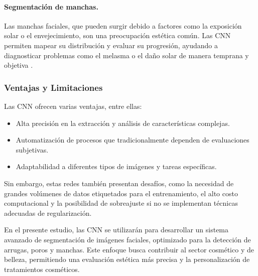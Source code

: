 \paragraph{Segmentación de manchas.}  
Las manchas faciales, que pueden surgir debido a factores como la exposición solar o el envejecimiento, son una preocupación estética común. Las CNN permiten mapear su distribución y evaluar su progresión, ayudando a diagnosticar problemas como el melasma o el daño solar de manera temprana y objetiva \parencite{autor2020segmentacion}.

\subsubsection{Ventajas y Limitaciones}  
Las CNN ofrecen varias ventajas, entre ellas:
\begin{itemize}
    \item Alta precisión en la extracción y análisis de características complejas.
    \item Automatización de procesos que tradicionalmente dependen de evaluaciones subjetivas.
    \item Adaptabilidad a diferentes tipos de imágenes y tareas específicas.
\end{itemize}

Sin embargo, estas redes también presentan desafíos, como la necesidad de grandes volúmenes de datos etiquetados para el entrenamiento, el alto costo computacional y la posibilidad de sobreajuste si no se implementan técnicas adecuadas de regularización.

En el presente estudio, las CNN se utilizarán para desarrollar un sistema avanzado de segmentación de imágenes faciales, optimizado para la detección de arrugas, poros y manchas. Este enfoque busca contribuir al sector cosmético y de belleza, permitiendo una evaluación estética más precisa y la personalización de tratamientos cosméticos.








